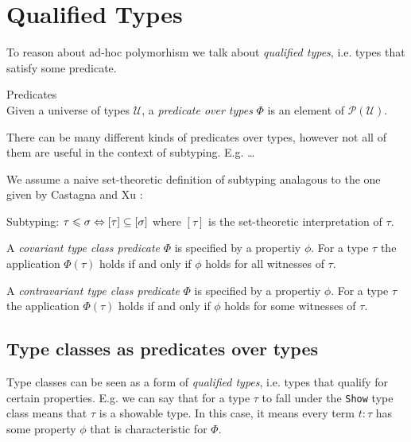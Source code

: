 \chapter{Qualified Types} \label{ch:qualified-types}

To reason about ad-hoc polymorhism we talk about \emph{qualified types}, i.e. types that satisfy some predicate.

\begin{definition} Predicates\\
  Given a universe of types $\mathcal{U}$, a \emph{predicate over types} $\Phi$ is an element of $\mathcal{P}(\mathcal{U})$.
\end{definition}

There can be many different kinds of predicates over types, however not all of them are useful in the context of subtyping.
E.g. \dots

We assume a naive set-theoretic definition of subtyping analagous to the one given by Castagna and Xu \cite{castagna}:

\begin{definition} Subtyping:
  $\tau \leqslant \sigma \Leftrightarrow [\tau] \subseteq [\sigma]$ where $[\tau]$ is the set-theoretic interpretation of $\tau$.
\end{definition}

\begin{definition}
  A \emph{covariant type class predicate} $\Phi$ is specified by a propertiy $\phi$.
  For a type $\tau$ the application $\Phi(\tau)$ holds if and only if $\phi$ holds for all witnesses of $\tau$.
\end{definition}

\begin{definition}
  A \emph{contravariant type class predicate} $\Phi$ is specified by a propertiy $\phi$.
  For a type $\tau$ the application $\Phi(\tau)$ holds if and only if $\phi$ holds for some witnesses of $\tau$.
\end{definition}

\section{Type classes as predicates over types}

Type classes can be seen as a form of \emph{qualified types}, i.e. types that qualify for certain properties.
E.g. we can say that for a type $\tau$ to fall under the \texttt{Show} type class means that $\tau$ is a showable type.
In this case, it means every term $t : \tau$ has some property $\phi$ that is characteristic for $\Phi$.

